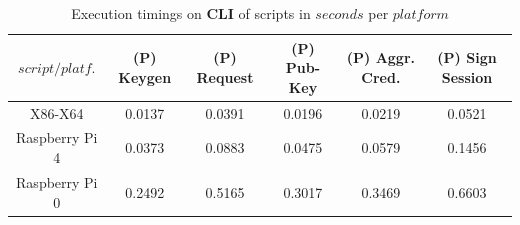 \documentclass[twocolumn]{article}
\begin{document}



\begin{table}[h!]
  \begin{center}
    \caption{Execution timings on \textbf{CLI} of scripts in $seconds$ per $platform$}
      \label{tab:table1}
        \begin{tabular} {c|c|c|c|c|c}
          \toprule
\textbf{$script / platf.$} & \textbf{(P) Keygen} & \textbf{(P) Request} & \textbf{(P) Pub-Key} & \textbf{(P) Aggr. Cred.} & \textbf{(P) Sign Session} \\
          \midrule
			X86-X64	&	0.0137	&	0.0391	&	0.0196	&	0.0219	&	0.0521		\\
Raspberry Pi 4	&	0.0373	&	0.0883	&	0.0475	&	0.0579	&	0.1456		\\
Raspberry Pi  0	&	0.2492	&	0.5165	&	0.3017	&	0.3469	&	0.6603		\\
      \bottomrule %
    \end{tabular}
  \end{center}
\end{table}
\end{document}

